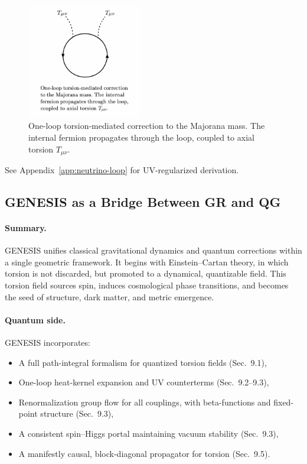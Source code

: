 \documentclass{article}
\begin{document}
\begin{figure}[h!]
\centering
\includegraphics[width=0.45\textwidth]{neutrino_loop.png}
\caption{One-loop torsion-mediated correction to the Majorana mass.
The internal fermion propagates through the loop, coupled to axial torsion \(T_{\mu\nu}\).}
\label{fig:neutrino_loop}
\end{figure}

See Appendix~\ref{app:neutrino-loop} for UV-regularized derivation.

\subsection*{ GENESIS as a Bridge Between GR and QG}
\label{sec:genesis-bridge}

\paragraph{Summary.}
GENESIS unifies classical gravitational dynamics and quantum corrections within a single geometric framework.  
It begins with Einstein–Cartan theory, in which torsion is not discarded, but promoted to a dynamical, quantizable field.  
This torsion field sources spin, induces cosmological phase transitions, and becomes the seed of structure, dark matter, and metric emergence.

\paragraph{Quantum side.}
GENESIS incorporates:
\begin{itemize}
    \item A full path-integral formalism for quantized torsion fields (Sec.~9.1),
    \item One-loop heat-kernel expansion and UV counterterms (Sec.~9.2–9.3),
    \item Renormalization group flow for all couplings, with beta-functions and fixed-point structure (Sec.~9.3),
    \item A consistent spin–Higgs portal maintaining vacuum stability (Sec.~9.3),
    \item A manifestly causal, block-diagonal propagator for torsion (Sec.~9.5).
\end{itemize}
\end{document}
